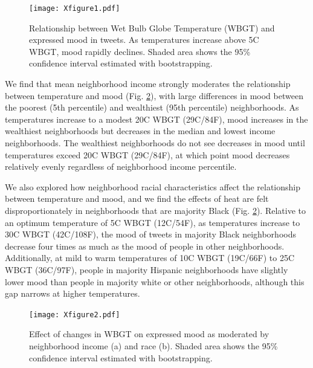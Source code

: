 \documentclass[titlepage]{article}
\begin{document}
\begin{figure}[H]
 \centering
 \texttt{[image: Xfigure1.pdf]}
 \caption{Relationship between Wet Bulb Globe Temperature (WBGT) and expressed mood in tweets. As temperatures increase above 5\textdegree C WBGT, mood rapidly declines.  Shaded area shows the 95\% confidence interval estimated with bootstrapping.}
 \label{fig:wbgt}
\end{figure}

We find that mean neighborhood income strongly moderates the relationship between temperature and mood (Fig. \ref{fig:hetero}), with large differences in mood between the poorest (5th percentile) and wealthiest (95th percentile) neighborhoods. As temperatures increase to a modest 20\textdegree C WBGT (29\textdegree C/84\textdegree F), mood increases in the wealthiest neighborhoods but decreases in the median and lowest income neighborhoods. The wealthiest neighborhoods do not see decreases in mood until temperatures exceed 20\textdegree C WBGT (29\textdegree C/84\textdegree F), at which point mood decreases relatively evenly regardless of neighborhood income percentile.

We also explored how neighborhood racial characteristics affect the relationship between temperature and mood, and we find the effects of heat are felt disproportionately in neighborhoods that are majority Black (Fig. \ref{fig:hetero}). Relative to an optimum temperature of 5\textdegree C WBGT (12\textdegree C/54\textdegree F), as temperatures increase to 30\textdegree C WBGT (42\textdegree C/108\textdegree F), the mood of tweets in majority Black neighborhoods decrease four times as much as the mood of people in other neighborhoods. Additionally, at mild to warm temperatures of 10\textdegree C WBGT (19\textdegree C/66\textdegree F) to 25\textdegree C WBGT (36\textdegree C/97\textdegree F), people in majority Hispanic neighborhoods have slightly lower mood than people in majority white or other neighborhoods, although this gap narrows at higher temperatures.

\begin{figure}[H]
  \texttt{[image: Xfigure2.pdf]}
  \caption{Effect of changes in WBGT on expressed mood as moderated by neighborhood income (a) and race (b). Shaded area shows the 95\% confidence interval estimated with bootstrapping.}
\label{fig:hetero}
\end{figure}
\end{document}
